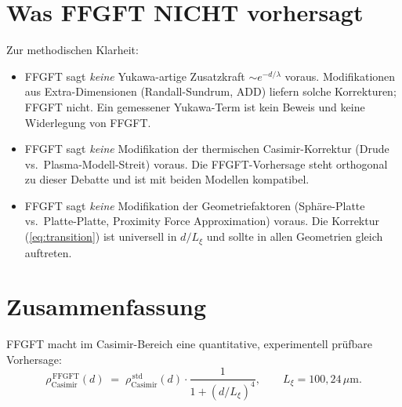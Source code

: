 \section{Was FFGFT NICHT vorhersagt}

Zur methodischen Klarheit:

\begin{itemize}[leftmargin=2em,itemsep=2pt,topsep=2pt]
  \item FFGFT sagt \emph{keine} Yukawa-artige Zusatzkraft
        $\sim e^{-d/\lambda}$ voraus. Modifikationen aus Extra-Dimensionen
        (Randall-Sundrum, ADD) liefern solche Korrekturen; FFGFT
        nicht. Ein gemessener Yukawa-Term ist kein Beweis und keine
        Widerlegung von FFGFT.
  \item FFGFT sagt \emph{keine} Modifikation der thermischen
        Casimir-Korrektur (Drude vs.\ Plasma-Modell-Streit) voraus.
        Die FFGFT-Vorhersage steht orthogonal zu dieser Debatte
        und ist mit beiden Modellen kompatibel.
  \item FFGFT sagt \emph{keine} Modifikation der Geometriefaktoren
        (Sphäre-Platte vs.\ Platte-Platte, Proximity Force
        Approximation) voraus. Die Korrektur (\ref{eq:transition})
        ist universell in $d/L_\xi$ und sollte in allen Geometrien
        gleich auftreten.
\end{itemize}

\section{Zusammenfassung}

FFGFT macht im Casimir-Bereich eine quantitative, experimentell
prüfbare Vorhersage:
\begin{equation*}
  \boxed{
    \rho_\text{Casimir}^{\,\text{FFGFT}}(d)
    \;=\; \rho_\text{Casimir}^{\,\text{std}}(d)
          \cdot \frac{1}{1 + (d/L_\xi)^4},
    \qquad L_\xi = 100{,}24\,\mu\text{m}.
  }
\end{equation*}

